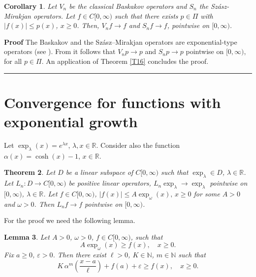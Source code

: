 \documentclass[preprint]{elsarticle}
\newtheorem{theorem}{Theorem}[section]
\newtheorem{corollary}[theorem]{Corollary}
\newtheorem{lemma}[theorem]{Lemma}
\numberwithin{equation}{section}
\newenvironment{proof}[1][Proof]{\noindent \textbf{#1} }{\  \rule{0.5em}{0.5em}}
\begin{document}
\begin{corollary}
	Let $V_n$ be the classical Baskakov operators and $S_n$ the Sz\'asz-Mirakjan operators. Let $f \in C[0,\infty)$ such that there exists $ p \in \Pi$ with $|f(x)| \leq p(x)$, $x \geq 0$.
	Then, $V_n f \to f$ and $S_n f \to f$, pointwise on $[0,\infty)$.\end{corollary}

\begin{proof}
The Baskakov and the Sz\'asz–Mirakjan operators are exponential-type operators (see  \cite[Theorem 3.3]{Ismail}). From \cite[Proposition 2.9]{Ismail} it follows that $V_n p \to p$ and $S_n p \to p$ pointwise on $[0,\infty)$, for all $p \in \Pi$. An application of Theorem \ref{T16} concludes the proof.
	\end{proof}

\section{Convergence for functions with exponential growth}
Let $\exp_{\lambda}(x)=e^{\lambda x}$, $\lambda,x\in{\mathbb R}$. Consider also the function $\alpha(x)=\cosh(x)-1$, $x\in {\mathbb R}$.

\begin{theorem}\label{T5.8} Let \(D\) be a linear subspace of \(C[0,\infty)\) such that \(\exp_\lambda \in D\), \(\lambda \in \mathbb{R}\).
	Let \(L_n : D \to C[0,\infty)\) be positive linear operators, \(L_n \exp_\lambda \to \exp_\lambda\) pointwise on \([0,\infty)\), \(\lambda \in \mathbb{R}\).
	Let \(f \in C[0,\infty)\), \(|f(x)| \le A  \exp_{\omega}(x),\, x\ge 0\) for some \(A>0\) and \(\omega>0\).
	Then \(L_n f \to f\) pointwise on \([0,\infty)\).
\end{theorem}

For the proof we need the following lemma.

	\begin{lemma} Let \(A>0\), \(\omega>0\), \(f \in C[0,\infty)\), such that
	\[
	A \exp_{\omega}(x)  \ge f(x), \quad x \ge 0.
	\]
	Fix \(a \ge 0\), \(\varepsilon > 0\). Then there exist \(\ell>0\), \(K \in \mathbb{N}\), \(m \in \mathbb{N}\) such that
	\begin{equation}
		K\, \alpha^{m}\!\left(\frac{x-a}{\ell}\right) + f(a) + \varepsilon \ge f(x), \quad x \ge 0. \label{ew1}
\end{equation}\end{lemma}
\end{document}
